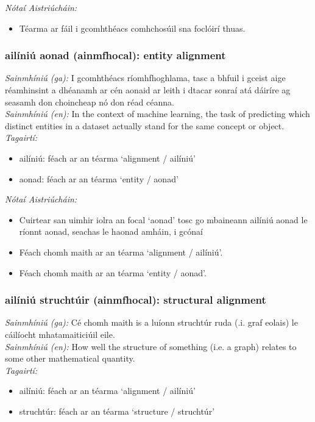  \noindent \textit{Nótaí Aistriúcháin:}
\begin{itemize}
	\item Téarma ar fáil i gcomhthéacs comhchosúil sna foclóirí thuas.
\end{itemize}


\subsubsection*{ailíniú aonad (ainmfhocal): entity alignment}
 \noindent \textit{Sainmhíniú (ga):} I gcomhthéacs ríomhfhoghlama, tasc a bhfuil i gceist aige réamhinsint a dhéanamh ar cén aonaid ar leith i dtacar sonraí atá dáiríre ag seasamh don choincheap nó don réad céanna.
\\
 \noindent \textit{Sainmhíniú (en):} In the context of machine learning, the task of predicting which distinct entities in a dataset actually stand for the same concept or object.
\\
 \noindent \textit{Tagairtí:}
\begin{itemize}
	\item ailíniú: féach ar an téarma `alignment / ailíniú'
	\item aonad: féach ar an téarma `entity / aonad'
\end{itemize}

 \noindent \textit{Nótaí Aistriúcháin:}
\begin{itemize}
	\item Cuirtear san uimhir iolra an focal `aonad' tosc go mbaineann ailíniú aonad le ríonnt aonad, seachas le haonad amháin, i gcónaí
	\item Féach chomh maith ar an téarma `alignment / ailíniú'.
	\item Féach chomh maith ar an téarma `entity / aonad'.
\end{itemize}


\subsubsection*{ailíniú struchtúir (ainmfhocal): structural alignment}
 \noindent \textit{Sainmhíniú (ga):} Cé chomh maith is a luíonn struchtúr ruda (.i. graf eolais) le cáilíocht mhatamaiticiúil eile.
\\
 \noindent \textit{Sainmhíniú (en):} How well the structure of something (i.e. a graph) relates to some other mathematical quantity.
\\
 \noindent \textit{Tagairtí:}
\begin{itemize}
	\item ailíniú: féach ar an téarma `alignment / ailíniú'
	\item struchtúr: féach ar an téarma `structure / struchtúr'
\end{itemize}

